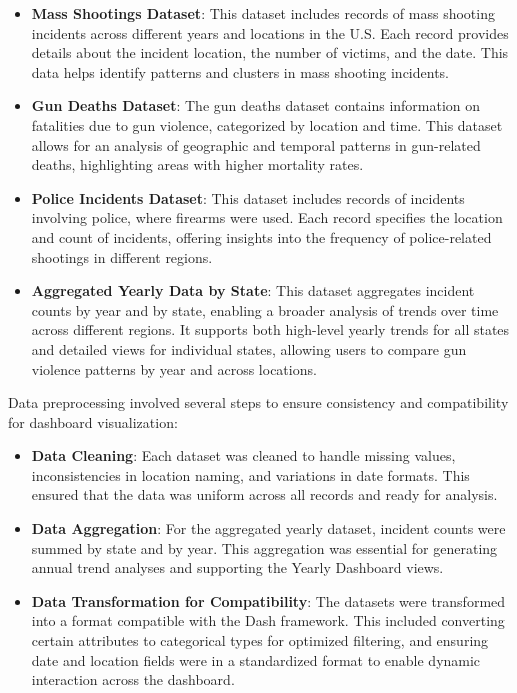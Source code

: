 \documentclass{article}
\begin{document}
\begin{itemize}
    \item \textbf{Mass Shootings Dataset}: This dataset includes records of mass shooting incidents across different years and locations in the U.S. Each record provides details about the incident location, the number of victims, and the date. This data helps identify patterns and clusters in mass shooting incidents.
    
    \item \textbf{Gun Deaths Dataset}: The gun deaths dataset contains information on fatalities due to gun violence, categorized by location and time. This dataset allows for an analysis of geographic and temporal patterns in gun-related deaths, highlighting areas with higher mortality rates.

    \item \textbf{Police Incidents Dataset}: This dataset includes records of incidents involving police, where firearms were used. Each record specifies the location and count of incidents, offering insights into the frequency of police-related shootings in different regions.

    \item \textbf{Aggregated Yearly Data by State}: This dataset aggregates incident counts by year and by state, enabling a broader analysis of trends over time across different regions. It supports both high-level yearly trends for all states and detailed views for individual states, allowing users to compare gun violence patterns by year and across locations.

\end{itemize}

Data preprocessing involved several steps to ensure consistency and compatibility for dashboard visualization:
\begin{itemize}
    \item \textbf{Data Cleaning}: Each dataset was cleaned to handle missing values, inconsistencies in location naming, and variations in date formats. This ensured that the data was uniform across all records and ready for analysis.
    
    \item \textbf{Data Aggregation}: For the aggregated yearly dataset, incident counts were summed by state and by year. This aggregation was essential for generating annual trend analyses and supporting the Yearly Dashboard views.

    \item \textbf{Data Transformation for Compatibility}: The datasets were transformed into a format compatible with the Dash framework. This included converting certain attributes to categorical types for optimized filtering, and ensuring date and location fields were in a standardized format to enable dynamic interaction across the dashboard.
\end{itemize}
\end{document}
